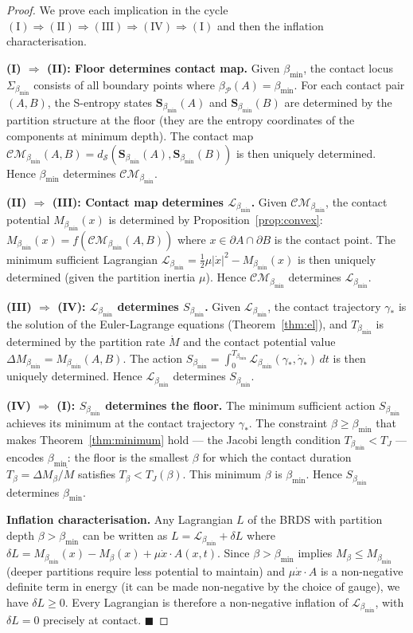 \documentclass[12pt, a4paper]{article}
\theoremstyle{plain}
\theoremstyle{definition}
\theoremstyle{remark}
\newcommand{\bmin}{\beta_{\min}}
\newcommand{\Lmin}{\mathcal{L}_{\bmin}}
\newcommand{\Smin}{S_{\bmin}}
\newcommand{\CM}{\mathcal{CM}}
\newcommand{\dS}{d_{\mathcal{S}}}
\newcommand{\Pcal}{\mathcal{P}}
\newcommand{\half}{\tfrac{1}{2}}
\newcommand{\qed}{\hfill$\blacksquare$}
\begin{document}
\begin{proof}
We prove each implication in the cycle $(\mathrm{I}) \Rightarrow (\mathrm{II})
\Rightarrow (\mathrm{III}) \Rightarrow (\mathrm{IV}) \Rightarrow (\mathrm{I})$
and then the inflation characterisation.

\medskip
\textbf{(I) $\Rightarrow$ (II): Floor determines contact map.}
Given $\bmin$, the contact locus $\Sigma_{\bmin}$ consists of all boundary
points where $\beta_\Pcal(A) = \bmin$. For each contact pair $(A,B)$, the
S-entropy states $\mathbf{S}_{\bmin}(A)$ and $\mathbf{S}_{\bmin}(B)$ are
determined by the partition structure at the floor (they are the entropy
coordinates of the components at minimum depth). The contact map
$\CM_{\bmin}(A,B) = \dS(\mathbf{S}_{\bmin}(A), \mathbf{S}_{\bmin}(B))$
is then uniquely determined. Hence $\bmin$ determines $\CM_{\bmin}$.

\medskip
\textbf{(II) $\Rightarrow$ (III): Contact map determines $\Lmin$.}
Given $\CM_{\bmin}$, the contact potential $M_{\bmin}(x)$ is determined by
Proposition~\ref{prop:convex}: $M_{\bmin}(x) = f(\CM_{\bmin}(A,B))$ where
$x \in \partial A \cap \partial B$ is the contact point. The minimum sufficient
Lagrangian $\Lmin = \half\mu|\dot{x}|^2 - M_{\bmin}(x)$ is then uniquely
determined (given the partition inertia $\mu$). Hence $\CM_{\bmin}$ determines
$\Lmin$.

\medskip
\textbf{(III) $\Rightarrow$ (IV): $\Lmin$ determines $\Smin$.}
Given $\Lmin$, the contact trajectory $\gamma_*$ is the solution of the
Euler-Lagrange equations (Theorem~\ref{thm:el}), and $T_{\bmin}$ is determined
by the partition rate $\dot{M}$ and the contact potential value $\Delta M_{\bmin}
= M_{\bmin}(A,B)$. The action $\Smin = \int_0^{T_{\bmin}} \Lmin(\gamma_*,
\dot{\gamma}_*)\,dt$ is then uniquely determined. Hence $\Lmin$ determines $\Smin$.

\medskip
\textbf{(IV) $\Rightarrow$ (I): $\Smin$ determines the floor.}
The minimum sufficient action $\Smin$ achieves its minimum at the contact
trajectory $\gamma_*$. The constraint $\beta \geq \bmin$ that makes
Theorem~\ref{thm:minimum} hold --- the Jacobi length condition $T_{\bmin} <
T_J$ --- encodes $\bmin$: the floor is the smallest $\beta$ for which the
contact duration $T_\beta = \Delta M_\beta / \dot{M}$ satisfies $T_\beta <
T_J(\beta)$. This minimum $\beta$ is $\bmin$. Hence $\Smin$ determines $\bmin$.

\medskip
\textbf{Inflation characterisation.}
Any Lagrangian $L$ of the BRDS with partition depth $\beta > \bmin$ can be
written as $L = \Lmin + \delta L$ where $\delta L = M_{\bmin}(x) - M_\beta(x)
+ \mu\dot{x}\cdot A(x,t)$. Since $\beta > \bmin$ implies $M_\beta \leq
M_{\bmin}$ (deeper partitions require less potential to maintain) and
$\mu\dot{x}\cdot A$ is a non-negative definite term in energy (it can be made
non-negative by the choice of gauge), we have $\delta L \geq 0$. Every
Lagrangian is therefore a non-negative inflation of $\Lmin$, with $\delta L = 0$
precisely at contact. \qed
\end{proof}
\end{document}
